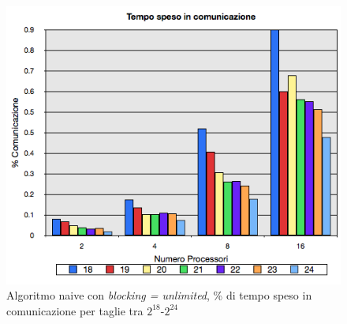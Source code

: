 \documentclass[12pt,a4paper,oneside,openright]{article}
\begin{document}
\begin{figure}[H] 
  \centering
      \includegraphics[height=0.4\textheight]{immagini/comunicazione_normale_senza_rete}
    \caption{\textsf{Algoritmo naive} con \emph{blocking = unlimited}, \% di tempo speso in comunicazione per taglie tra $2^{18}$-$2^{24}$}
\end{figure}
\end{document}
